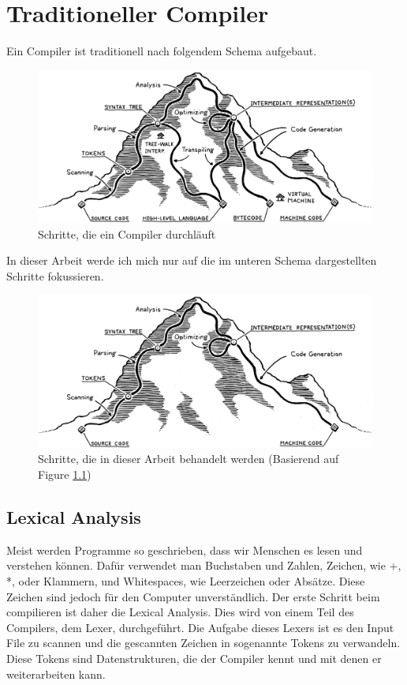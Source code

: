 \chapter{Traditioneller Compiler}

Ein Compiler ist traditionell nach folgendem Schema aufgebaut.

\begin{figure}[h!]
    \centering
    \includegraphics[scale=0.2]{resources/images/mountain.png}
    \caption{Schritte, die ein Compiler durchläuft \cite{Compiler:Mountain}}
    \label{fig:mountain}
\end{figure}

In dieser Arbeit werde ich mich nur auf die im unteren Schema dargestellten Schritte fokussieren.

\begin{figure}[h!]
    \centering
    \includegraphics[scale=0.2]{resources/images/mountain-edited.png}
    \caption{Schritte, die in dieser Arbeit behandelt werden (Basierend auf Figure \ref{fig:mountain})}
    \label{fig:mountain-edited}
\end{figure}

\section{Lexical Analysis}
Meist werden Programme so geschrieben, dass wir Menschen es lesen und verstehen können. Dafür verwendet man Buchstaben und Zahlen, Zeichen, wie +, *, oder Klammern, und Whitespaces, wie Leerzeichen oder Absätze.
Diese Zeichen sind jedoch für den Computer unverständlich. Der erste Schritt beim compilieren ist daher die Lexical Analysis. Dies wird von einem Teil des Compilers, dem Lexer, durchgeführt.
Die Aufgabe dieses Lexers ist es den Input File zu scannen und die gescannten Zeichen in sogenannte Tokens zu verwandeln. Diese Tokens sind Datenstrukturen, die der Compiler kennt und mit denen er weiterarbeiten kann.

